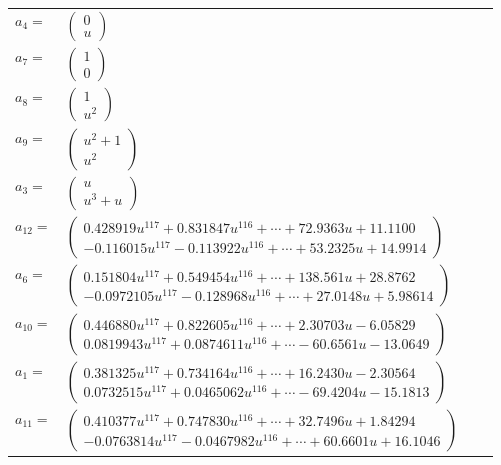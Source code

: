 \documentclass[1p]{elsarticle_modified}
\theoremstyle{definition}
\begin{document}
\begin{tabular}{m{7pt} m{180pt} m{7pt} m{180pt} }
\flushright $a_{4}=$&$\begin{pmatrix}0\\u\end{pmatrix}$ \\
\flushright $a_{7}=$&$\begin{pmatrix}1\\0\end{pmatrix}$ \\
\flushright $a_{8}=$&$\begin{pmatrix}1\\u^2\end{pmatrix}$ \\
\flushright $a_{9}=$&$\begin{pmatrix}u^2+1\\u^2\end{pmatrix}$ \\
\flushright $a_{3}=$&$\begin{pmatrix}u\\u^3+u\end{pmatrix}$ \\
\flushright $a_{12}=$&$\begin{pmatrix}0.428919 u^{117}+0.831847 u^{116}+\cdots+72.9363 u+11.1100\\-0.116015 u^{117}-0.113922 u^{116}+\cdots+53.2325 u+14.9914\end{pmatrix}$ \\
\flushright $a_{6}=$&$\begin{pmatrix}0.151804 u^{117}+0.549454 u^{116}+\cdots+138.561 u+28.8762\\-0.0972105 u^{117}-0.128968 u^{116}+\cdots+27.0148 u+5.98614\end{pmatrix}$ \\
\flushright $a_{10}=$&$\begin{pmatrix}0.446880 u^{117}+0.822605 u^{116}+\cdots+2.30703 u-6.05829\\0.0819943 u^{117}+0.0874611 u^{116}+\cdots-60.6561 u-13.0649\end{pmatrix}$ \\
\flushright $a_{1}=$&$\begin{pmatrix}0.381325 u^{117}+0.734164 u^{116}+\cdots+16.2430 u-2.30564\\0.0732515 u^{117}+0.0465062 u^{116}+\cdots-69.4204 u-15.1813\end{pmatrix}$ \\
\flushright $a_{11}=$&$\begin{pmatrix}0.410377 u^{117}+0.747830 u^{116}+\cdots+32.7496 u+1.84294\\-0.0763814 u^{117}-0.0467982 u^{116}+\cdots+60.6601 u+16.1046\end{pmatrix}$ \\

\end{tabular}
\end{document}

